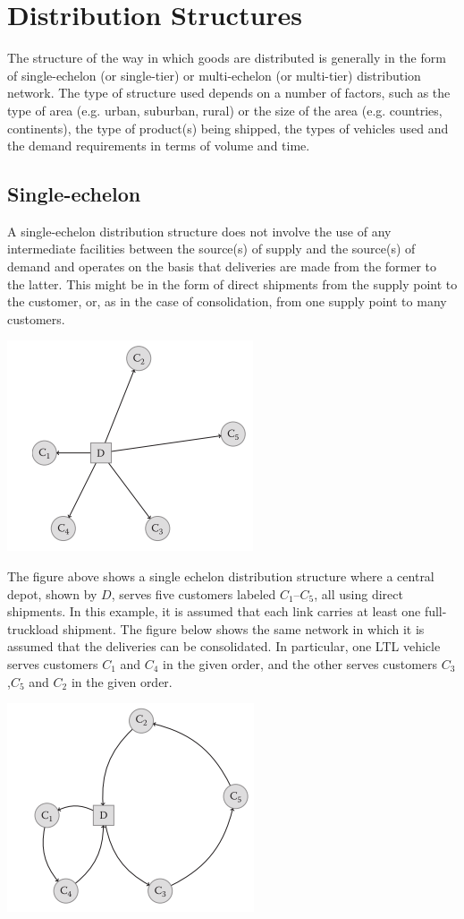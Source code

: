 \section{Distribution Structures}
The structure of the way in which goods are distributed is generally in the form of single-echelon (or single-tier) or multi-echelon (or multi-tier) distribution network. The type of structure used depends on a number of factors, such as the type of area (e.g. urban, suburban, rural) or the size of the area (e.g. countries, continents), the type of product(s) being shipped, the types of vehicles used and the demand requirements in terms of volume and time.
\subsection{Single-echelon }
A single-echelon distribution structure does not involve the use of any intermediate facilities between the source(s) of supply and the source(s) of demand and operates on the basis that deliveries are made from the former to the latter. This might be in the form of direct shipments from the supply point to the customer, or, as in the case of consolidation, from one supply point to many customers.
\begin{center}
	\includegraphics{gfx/fig35.png}
\end{center}
The figure above shows a single echelon distribution structure where a central
depot, shown by $ D $, serves five customers labeled $ C_1–C_5 $, all using direct shipments. In this example, it is assumed that each link carries at least one full-truckload shipment. The figure below shows the same network in which it is assumed that the deliveries can be consolidated. In particular, one LTL vehicle serves customers $ C_1 $ and $ C_4 $ in the given order, and the other serves customers $ C_3 $,$ C_5 $ and $ C_2 $ in the given order.
\begin{center}
	\includegraphics{gfx/fig36.png}
\end{center}
%
